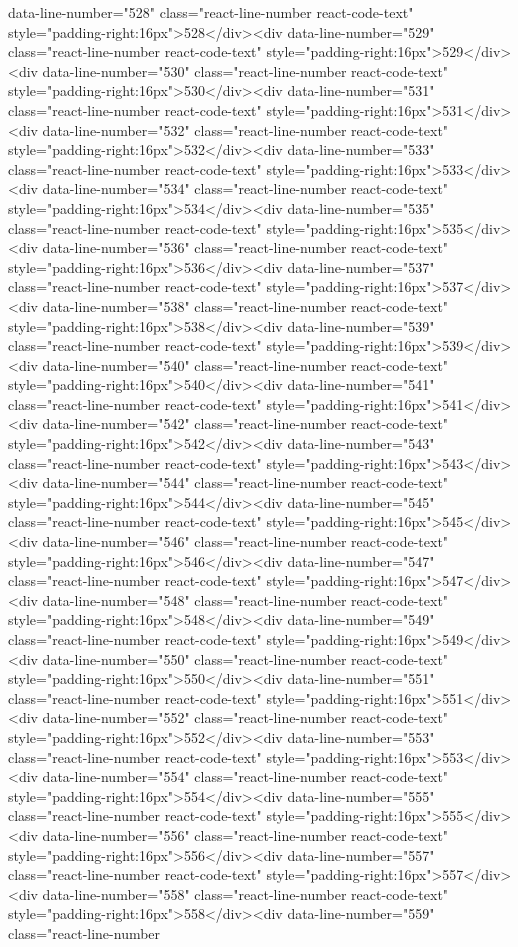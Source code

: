 data-line-number="528" class="react-line-number react-code-text" style="padding-right:16px">528</div><div data-line-number="529" class="react-line-number react-code-text" style="padding-right:16px">529</div><div data-line-number="530" class="react-line-number react-code-text" style="padding-right:16px">530</div><div data-line-number="531" class="react-line-number react-code-text" style="padding-right:16px">531</div><div data-line-number="532" class="react-line-number react-code-text" style="padding-right:16px">532</div><div data-line-number="533" class="react-line-number react-code-text" style="padding-right:16px">533</div><div data-line-number="534" class="react-line-number react-code-text" style="padding-right:16px">534</div><div data-line-number="535" class="react-line-number react-code-text" style="padding-right:16px">535</div><div data-line-number="536" class="react-line-number react-code-text" style="padding-right:16px">536</div><div data-line-number="537" class="react-line-number react-code-text" style="padding-right:16px">537</div><div data-line-number="538" class="react-line-number react-code-text" style="padding-right:16px">538</div><div data-line-number="539" class="react-line-number react-code-text" style="padding-right:16px">539</div><div data-line-number="540" class="react-line-number react-code-text" style="padding-right:16px">540</div><div data-line-number="541" class="react-line-number react-code-text" style="padding-right:16px">541</div><div data-line-number="542" class="react-line-number react-code-text" style="padding-right:16px">542</div><div data-line-number="543" class="react-line-number react-code-text" style="padding-right:16px">543</div><div data-line-number="544" class="react-line-number react-code-text" style="padding-right:16px">544</div><div data-line-number="545" class="react-line-number react-code-text" style="padding-right:16px">545</div><div data-line-number="546" class="react-line-number react-code-text" style="padding-right:16px">546</div><div data-line-number="547" class="react-line-number react-code-text" style="padding-right:16px">547</div><div data-line-number="548" class="react-line-number react-code-text" style="padding-right:16px">548</div><div data-line-number="549" class="react-line-number react-code-text" style="padding-right:16px">549</div><div data-line-number="550" class="react-line-number react-code-text" style="padding-right:16px">550</div><div data-line-number="551" class="react-line-number react-code-text" style="padding-right:16px">551</div><div data-line-number="552" class="react-line-number react-code-text" style="padding-right:16px">552</div><div data-line-number="553" class="react-line-number react-code-text" style="padding-right:16px">553</div><div data-line-number="554" class="react-line-number react-code-text" style="padding-right:16px">554</div><div data-line-number="555" class="react-line-number react-code-text" style="padding-right:16px">555</div><div data-line-number="556" class="react-line-number react-code-text" style="padding-right:16px">556</div><div data-line-number="557" class="react-line-number react-code-text" style="padding-right:16px">557</div><div data-line-number="558" class="react-line-number react-code-text" style="padding-right:16px">558</div><div data-line-number="559" class="react-line-number 
